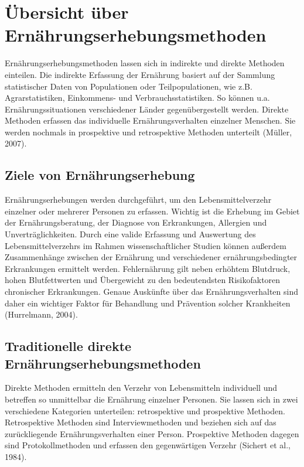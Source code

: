 \newpage
\section{Übersicht über Ernährungserhebungsmethoden}

Ernährungserhebungsmethoden lassen sich in indirekte und direkte Methoden einteilen. Die indirekte Erfassung der Ernährung basiert auf der Sammlung statistischer Daten von Populationen oder Teilpopulationen, wie z.B. Agrarstatistiken, Einkommens- und Verbrauchsstatistiken. So können u.a. Ernährungssituationen verschiedener Länder gegenübergestellt werden. Direkte Methoden erfassen das individuelle Ernährungsverhalten einzelner Menschen. Sie werden nochmals in prospektive und retrospektive Methoden unterteilt (Müller, 2007). 

\subsection{Ziele von Ernährungserhebung}

Ernährungserhebungen werden durchgeführt, um den Lebensmittelverzehr einzelner oder mehrerer Personen zu erfassen. Wichtig ist die Erhebung im Gebiet der Ernährungsberatung, der Diagnose von Erkrankungen, Allergien und Unverträglichkeiten. Durch eine valide Erfassung und Auswertung des Lebensmittelverzehrs im Rahmen wissenschaftlicher Studien können außerdem Zusammenhänge zwischen der Ernährung und verschiedener ernährungsbedingter Erkrankungen ermittelt werden. Fehlernährung gilt neben erhöhtem Blutdruck, hohen Blutfettwerten und Übergewicht zu den bedeutendsten Risikofaktoren chronischer Erkrankungen. Genaue Auskünfte über das Ernährungsverhalten sind daher ein wichtiger Faktor für Behandlung und Prävention solcher Krankheiten (Hurrelmann, 2004).

\subsection{Traditionelle direkte Ernährungserhebungsmethoden}

Direkte Methoden ermitteln den Verzehr von Lebensmitteln individuell und betreffen so unmittelbar die Ernährung einzelner Personen. Sie lassen sich in zwei verschiedene Kategorien unterteilen: retrospektive und prospektive Methoden. Retrospektive Methoden sind Interviewmethoden und beziehen sich auf das zurückliegende Ernährungsverhalten einer Person. Prospektive Methoden dagegen sind Protokollmethoden und erfassen den gegenwärtigen Verzehr (Sichert et al., 1984).

